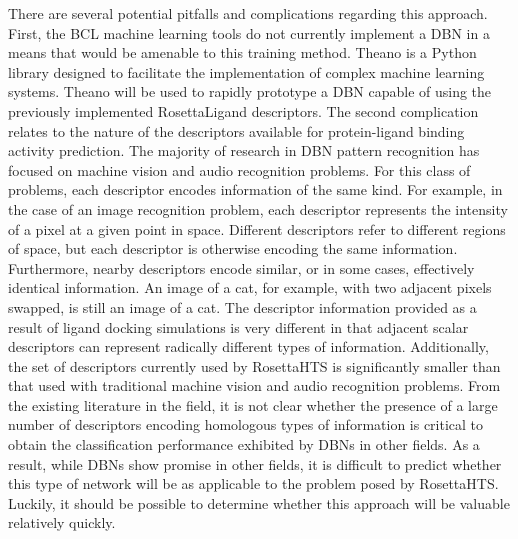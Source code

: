 There are several potential pitfalls and complications regarding this approach.
First, the BCL machine learning tools do not currently implement a DBN in a means that would be amenable to this training method.
Theano\citep{Bergstra:2010tc} is a Python library designed to facilitate the implementation of complex machine learning systems.
Theano will be used to rapidly prototype a DBN capable of using the previously implemented RosettaLigand descriptors.
The second complication relates to the nature of the descriptors available for protein-ligand binding activity prediction.
The majority of research in DBN pattern recognition has focused on machine vision and audio recognition problems.
For this class of problems, each descriptor encodes information of the same kind.
For example, in the case of an image recognition problem, each descriptor represents the intensity of a pixel at a given point in space.
Different descriptors refer to different regions of space, but each descriptor is otherwise encoding the same information.
Furthermore, nearby descriptors encode similar, or in some cases, effectively identical information.
An image of a cat, for example, with two adjacent pixels swapped, is still an image of a cat.
The descriptor information provided as a result of ligand docking simulations is very different in that adjacent scalar descriptors can represent radically different types of information.
Additionally, the set of descriptors currently used by RosettaHTS is significantly smaller than that used with traditional machine vision and audio recognition problems.
From the existing literature in the field, it is not clear whether the presence of a large number of descriptors encoding homologous types of information is critical to obtain the classification performance exhibited by DBNs in other fields.
As a result, while DBNs show promise in other fields, it is difficult to predict whether this type of network will be as applicable to the problem posed by RosettaHTS.
Luckily, it should be possible to determine whether this approach will be valuable relatively quickly.
